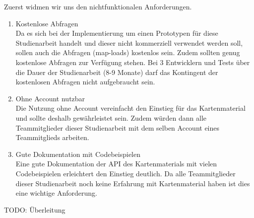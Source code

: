 Zuerst widmen wir uns den nichtfunktionalen Anforderungen.
\begin{enumerate}
\item Kostenlose Abfragen \\
Da es sich bei der Implementierung um einen Prototypen für diese Studienarbeit handelt und dieser nicht kommerziell verwendet werden soll, sollen auch die Abfragen (map-loads) kostenlos sein. Zudem sollten genug kostenlose Abfragen zur Verfügung stehen. Bei 3 Entwicklern und Tests über die Dauer der Studienarbeit (8-9 Monate) darf das Kontingent der kostenlosen Abfragen nicht aufgebraucht sein.

\item Ohne Account nutzbar\\
Die Nutzung ohne Account vereinfacht den Einstieg für das Kartenmaterial und sollte deshalb gewährleistet sein. Zudem würden dann alle Teammitglieder dieser Studienarbeit mit dem selben Account eines Teammitglieds arbeiten. 

\item Gute Dokumentation mit Codebeispielen\\
Eine gute Dokumentation der API des Kartenmaterials mit vielen Codebeispielen erleichtert den Einstieg deutlich. Da alle Teammitglieder dieser Studienarbeit noch keine Erfahrung mit Kartenmaterial haben ist dies eine wichtige Anforderung. 


\end{enumerate}



TODO: Überleitung

